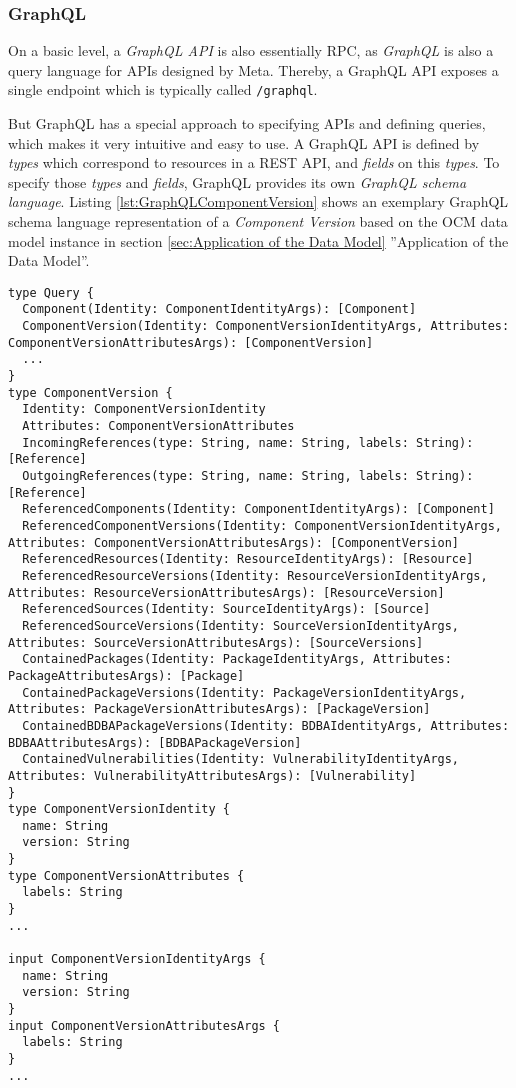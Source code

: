 \subsubsection{GraphQL}
On a basic level, a \emph{GraphQL API} is also essentially RPC, as \emph{GraphQL} is also a query language for APIs \cite{GraphQL} designed by Meta. Thereby, a GraphQL API exposes a single endpoint which is typically called \lstinline|/graphql|.\par
But GraphQL has a special approach to specifying APIs and defining queries, which makes it very intuitive and easy to use. A GraphQL API is defined by \emph{types} which correspond to resources in a REST API, and \emph{fields} on this \emph{types}. To specify those \emph{types} and \emph{fields}, GraphQL provides its own \emph{GraphQL schema language}. Listing \ref{lst:GraphQLComponentVersion} shows an exemplary GraphQL schema language representation of a \emph{Component Version} based on the OCM data model instance in section \ref{sec:Application of the Data Model} ''Application of the Data Model''.

\begin{lstlisting}[basicstyle=\tiny, caption=GraphQL Component Version Schema, captionpos=b, label=lst:GraphQLComponentVersion]
type Query {
  Component(Identity: ComponentIdentityArgs): [Component]
  ComponentVersion(Identity: ComponentVersionIdentityArgs, Attributes: ComponentVersionAttributesArgs): [ComponentVersion]
  ...
}
type ComponentVersion {
  Identity: ComponentVersionIdentity
  Attributes: ComponentVersionAttributes
  IncomingReferences(type: String, name: String, labels: String): [Reference]
  OutgoingReferences(type: String, name: String, labels: String): [Reference]
  ReferencedComponents(Identity: ComponentIdentityArgs): [Component]
  ReferencedComponentVersions(Identity: ComponentVersionIdentityArgs, Attributes: ComponentVersionAttributesArgs): [ComponentVersion]
  ReferencedResources(Identity: ResourceIdentityArgs): [Resource]
  ReferencedResourceVersions(Identity: ResourceVersionIdentityArgs, Attributes: ResourceVersionAttributesArgs): [ResourceVersion]
  ReferencedSources(Identity: SourceIdentityArgs): [Source]
  ReferencedSourceVersions(Identity: SourceVersionIdentityArgs, Attributes: SourceVersionAttributesArgs): [SourceVersions]
  ContainedPackages(Identity: PackageIdentityArgs, Attributes: PackageAttributesArgs): [Package]
  ContainedPackageVersions(Identity: PackageVersionIdentityArgs, Attributes: PackageVersionAttributesArgs): [PackageVersion]
  ContainedBDBAPackageVersions(Identity: BDBAIdentityArgs, Attributes: BDBAAttributesArgs): [BDBAPackageVersion]
  ContainedVulnerabilities(Identity: VulnerabilityIdentityArgs, Attributes: VulnerabilityAttributesArgs): [Vulnerability]
}
type ComponentVersionIdentity {
  name: String
  version: String
}
type ComponentVersionAttributes {
  labels: String
}
...

input ComponentVersionIdentityArgs {
  name: String
  version: String
}
input ComponentVersionAttributesArgs {
  labels: String
}
...
\end{lstlisting}

